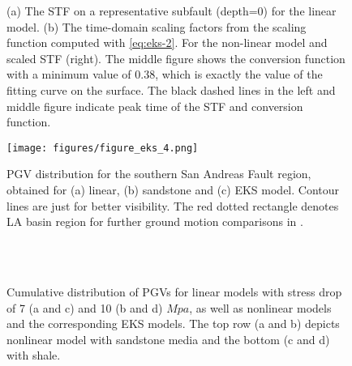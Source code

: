 \clearpage
\begin{figure}[!ht]
     \hfil
     \hfil
    \caption{(a) The STF on a representative subfault (depth=0) for the linear model. (b) The time-domain scaling factors from the scaling function computed with \cref{eq:eks-2}. For the non-linear model and scaled STF (right). The middle figure shows the conversion function with a minimum value of 0.38, which is exactly the value of the fitting curve on the surface. The black dashed lines in the left and middle figure indicate peak time of the STF and conversion function.}
    \label{fig:eks-3}
\end{figure}
\clearpage

\clearpage
\begin{figure}[!ht]
    \texttt{[image: figures/figure\_eks\_4.png]}
    \caption{PGV distribution for the southern San Andreas Fault region, obtained for (a) linear, (b) sandstone and (c) EKS model. Contour lines are just for better visibility. The red dotted rectangle denotes LA basin region for further ground motion comparisons in .}
    \label{fig:eks-4}
\end{figure}


\clearpage
{}
\begin{figure}[!ht]
     \hfil%
     \\[\baselineskip]%
     \hfil%
     \\[\baselineskip]

    \caption{Cumulative distribution of PGVs for linear models with stress drop of 7 (a and c) and 10 (b and d) $Mpa$, as well as nonlinear models and the corresponding EKS models. The top row (a and b) depicts nonlinear model with sandstone media and the bottom (c and d) with shale.}
    \label{fig:eks-5}
\end{figure}

